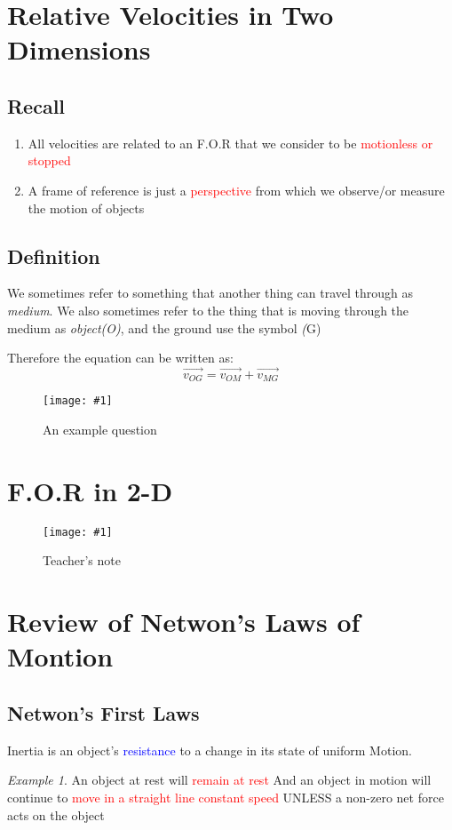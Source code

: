 \documentclass[11pt]{report}
\theoremstyle{remark}
\newtheorem*{example}{Example}
\newcommand{\mypic}[3]{
    \begin{figure}[h!]
        \centering
        \texttt{[image: \#1]}
        \caption{#2}
    \end{figure}
}
\begin{document}
\section{Relative Velocities in Two Dimensions}
\subsection{Recall}
\begin{enumerate}
    \item All velocities are related to an F.O.R that we consider to be \textcolor{red}{motionless or stopped}
    \item A frame of reference is just a \textcolor{red}{perspective} from which we observe/or measure the motion of objects
\end{enumerate}
\subsection{Definition}
We sometimes refer to something that another thing can travel through as \textit{medium}. We also sometimes refer to the thing that is moving through the medium as \textit{object(O)}, and the 
ground use the symbol \textit(G)

Therefore the equation can be written as:
\[
\vec{v_{OG}} = \vec{v_{OM}} + \vec{v_{MG}}
\]

\mypic{graph/graph4.png}{An example question}{0.9}
\newpage
\section{F.O.R in 2-D}
\mypic{graph/graph5.png}{Teacher's note}{0.9}
\newpage

\section{Review of Netwon's Laws of Montion}
\subsection{Netwon's First Laws}
Inertia is an object's \textcolor{blue}{resistance} to a change in its state of uniform Motion.
\begin{example}
    An object at rest will \textcolor{red}{remain at rest} And an object in motion will continue
    to \textcolor{red}{move in a straight line constant speed} UNLESS a non-zero net force acts on 
    the object
\end{example}
\end{document}
